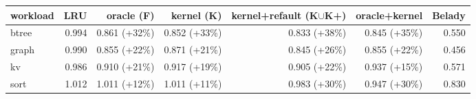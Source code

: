 \begin{tabular}{lrrrrrr}
\toprule
workload & LRU & oracle (F) & kernel (K) & kernel{+}refault (K$\cup$K{+}) & oracle{+}kernel & Belady \\
\midrule
btree & 0.994 & 0.861 ({+}32\%) & 0.852 ({+}33\%) & 0.833 ({+}38\%) & 0.845 ({+}35\%) & 0.550 \\
graph & 0.990 & 0.855 ({+}22\%) & 0.871 ({+}21\%) & 0.845 ({+}26\%) & 0.855 ({+}22\%) & 0.456 \\
kv & 0.986 & 0.910 ({+}21\%) & 0.917 ({+}19\%) & 0.905 ({+}22\%) & 0.937 ({+}15\%) & 0.571 \\
sort & 1.012 & 1.011 ({+}12\%) & 1.011 ({+}11\%) & 0.983 ({+}30\%) & 0.947 ({+}30\%) & 0.830 \\
\bottomrule
\end{tabular}
